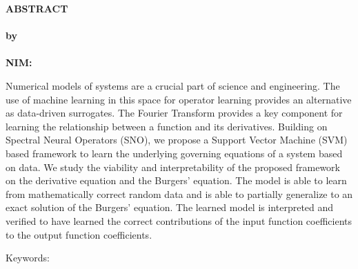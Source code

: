 \clearpage
{}
\begin{center}
\textbf{\large  ABSTRACT}\\[0.5cm]
\textbf{\large \judulcapitalized}\\[0.5cm]
\textbf{by}\\
\textbf{\penulis}\\
\textbf{NIM:\@\nim}\\[2em]
\end{center}

\noindent Numerical models of systems are a crucial part of science and engineering. The use of machine learning in this space for operator learning provides an alternative as data-driven surrogates. The Fourier Transform provides a key component for learning the relationship between a function and its derivatives. Building on Spectral Neural Operators (SNO), we propose a Support Vector Machine (SVM) based framework to learn the underlying governing equations of a system based on data. We study the viability and interpretability of the proposed framework on the derivative equation and the Burgers' equation. The model is able to learn from mathematically correct random data and is able to partially generalize to an exact solution of the Burgers' equation. The learned model is interpreted and verified to have learned the correct contributions of the input function coefficients to the output function coefficients.

\noindent Keywords: \keywords{}